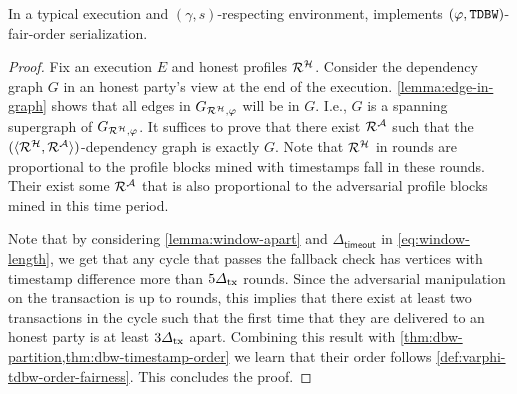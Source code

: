 \begin{theorem} \label{thm:fairness}
    In a typical execution and $(\gamma, s)$-respecting environment, \Taxis implements $(\varphi, \mathtt{TDBW})$-fair-order serialization.
\end{theorem}

\begin{proof}
    Fix an execution $E$ and honest profiles $\mathcal{R}^\mathcal{H}$.
    Consider the dependency graph $G$ in an honest party's view at the end of the execution.
    \cref{lemma:edge-in-graph} shows that all edges in $G_{\mathcal{R}^\mathcal{H}, \varphi}$ will be in $G$.
    I.e., $G$ is a spanning supergraph of $G_{\mathcal{R}^\mathcal{H}, \varphi}$.
    It suffices to prove that there exist $\mathcal{R}^\mathcal{A}$ such that the $(\langle \mathcal{R}^\mathcal{H}, \mathcal{R}^\mathcal{A} \rangle)$-dependency graph is exactly $G$.
    Note that $\mathcal{R}^\mathcal{H}$ in \PBWindowLen rounds are proportional to the profile blocks mined with timestamps fall in these \PBWindowLen rounds.
    Their exist some $\mathcal{R}^\mathcal{A}$ that is also proportional to the adversarial profile blocks mined in this time period.

    Note that by considering \cref{lemma:window-apart} and $\varDelta_{\mathsf{timeout}}$ in \cref{eq:window-length}, we get that any cycle that passes the fallback check has vertices with timestamp difference more than $5\varDelta_{\mathrm{tx}}$ rounds.
    Since the adversarial manipulation on the transaction is up to \txDelay rounds, this implies that there exist at least two transactions in the cycle such that the first time that they are delivered to an honest party is at least $3\varDelta_{\mathrm{tx}}$ apart.
    Combining this result with \cref{thm:dbw-partition,thm:dbw-timestamp-order} we learn that their order follows \cref{def:varphi-tdbw-order-fairness}.
    This concludes the proof.
\end{proof}
